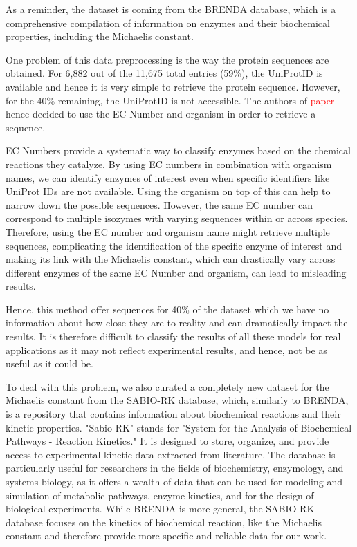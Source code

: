 As a reminder, the dataset is coming from the BRENDA database, which is a comprehensive compilation of information 
on enzymes and their biochemical properties, including the Michaelis constant.

One problem of this data preprocessing is the way the protein sequences are obtained. For 6,882 out of the
11,675 total entries (59\%), the UniProtID is available and hence it is very simple to retrieve the protein
sequence. However, for the 40\% remaining, the UniProtID is not accessible. The authors of \textcolor{red}{paper}
hence decided to use the EC Number and organism in order to retrieve a sequence.

EC Numbers provide a systematic way to classify enzymes based on the chemical reactions they catalyze. 
By using EC numbers in combination with organism names, we can identify enzymes of interest even when 
specific identifiers like UniProt IDs are not available. Using the organism on top of this can help to narrow
down the possible sequences. However, the same EC number can correspond to multiple isozymes with varying 
sequences within or across species. Therefore, using the EC number and organism name might retrieve multiple 
sequences, complicating the identification of the specific enzyme of interest and making its link with the
Michaelis constant, which can drastically vary across different enzymes of the same EC Number and organism, can
lead to misleading results.

Hence, this method offer sequences for 40\% of the dataset which we have no information about how close they
are to reality and can dramatically impact the results. It is therefore difficult to classify the results of
all these models for real applications as it may not reflect experimental results, and hence, not be as 
useful as it could be.

To deal with this problem, we also curated a completely new dataset for the Michaelis constant from the
SABIO-RK database, which, similarly to BRENDA, is a repository that contains information about biochemical 
reactions and their kinetic properties. "Sabio-RK" stands for "System for the Analysis of Biochemical 
Pathways - Reaction Kinetics." It is designed to store, organize, and provide access to experimental 
kinetic data extracted from literature. The database is particularly useful for researchers in the fields 
of biochemistry, enzymology, and systems biology, as it offers a wealth of data that can be used for 
modeling and simulation of metabolic pathways, enzyme kinetics, and for the design of biological experiments.
While BRENDA is more general, the SABIO-RK database focuses on the kinetics of biochemical reaction, like 
the Michaelis constant and therefore provide more specific and reliable data for our work.

